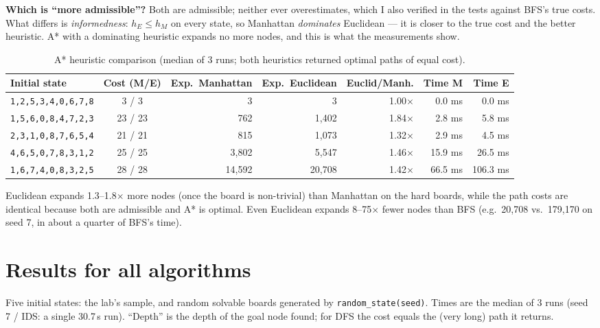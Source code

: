 \documentclass[11pt,a4paper]{article}
\begin{document}
\textbf{Which is ``more admissible''?} Both are admissible; neither ever overestimates, which I also verified in the tests against BFS's true costs. What differs is \emph{informedness}: $h_E\le h_M$ on every state, so Manhattan \emph{dominates} Euclidean --- it is closer to the true cost and the better heuristic. A* with a dominating heuristic expands no more nodes, and this is what the measurements show.

\begin{table}[H]\centering\small
\caption{A* heuristic comparison (median of 3 runs; both heuristics returned optimal paths of equal cost).}
\begin{tabular}{lcrrrrr}\toprule
Initial state & Cost (M/E) & Exp.\ Manhattan & Exp.\ Euclidean & Euclid/Manh. & Time M & Time E\\\midrule
\texttt{1,2,5,3,4,0,6,7,8} & 3 / 3 & 3 & 3 & 1.00$\times$ & 0.0 ms & 0.0 ms \\
\texttt{1,5,6,0,8,4,7,2,3} & 23 / 23 & 762 & 1{,}402 & 1.84$\times$ & 2.8 ms & 5.8 ms \\
\texttt{2,3,1,0,8,7,6,5,4} & 21 / 21 & 815 & 1{,}073 & 1.32$\times$ & 2.9 ms & 4.5 ms \\
\texttt{4,6,5,0,7,8,3,1,2} & 25 / 25 & 3{,}802 & 5{,}547 & 1.46$\times$ & 15.9 ms & 26.5 ms \\
\texttt{1,6,7,4,0,8,3,2,5} & 28 / 28 & 14{,}592 & 20{,}708 & 1.42$\times$ & 66.5 ms & 106.3 ms \\
\bottomrule\end{tabular}\end{table}

Euclidean expands 1.3--1.8$\times$ more nodes (once the board is non-trivial) than Manhattan on the hard boards, while the path costs are identical because both are admissible and A* is optimal. Even Euclidean expands 8--75$\times$ fewer nodes than BFS (e.g.\ 20{,}708 vs.\ 179{,}170 on seed 7, in about a quarter of BFS's time).

\section{Results for all algorithms}
Five initial states: the lab's sample, and random solvable boards generated by \texttt{random\_state(seed)}. Times are the median of 3 runs (seed 7 / IDS: a single 30.7\,s run). ``Depth'' is the depth of the goal node found; for DFS the cost equals the (very long) path it returns.
\end{document}
